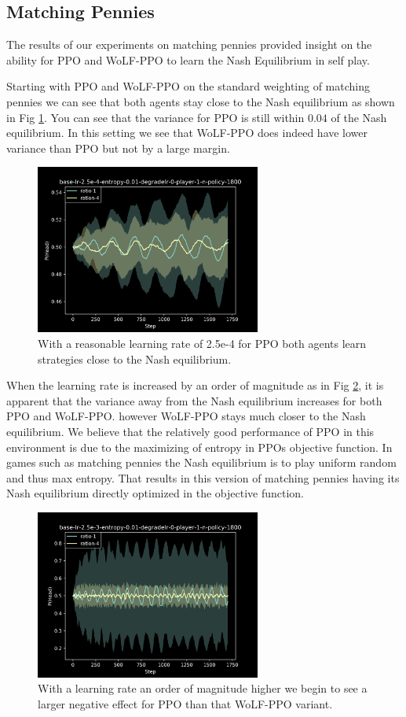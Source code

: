 \documentclass{article}
\begin{document}
\subsection{Matching Pennies}

The results of our experiments on matching pennies provided insight on the ability for PPO and WoLF-PPO to learn the Nash Equilibrium in self play.

Starting with PPO and WoLF-PPO on the standard weighting of matching pennies we can see that both agents stay close to the Nash equilibrium as shown in Fig \ref{fig:mp-ppo-e4}. You can see that the variance for PPO is still within $0.04$ of the Nash equilibrium. In this setting we see that WoLF-PPO does indeed have lower variance than PPO but not by a large margin.

\begin{figure}
    \centering
    \includegraphics[width=20em]{Figures/mp-ppo-e4.png}
    \caption{With a reasonable learning rate of 2.5e-4 for PPO both agents learn strategies close to the Nash equilibrium.}
    \label{fig:mp-ppo-e4}
\end{figure}

When the learning rate is increased by an order of magnitude as in Fig \ref{fig:mp-ppo-e3}, it is apparent that the variance away from the Nash equilibrium increases for both PPO and WoLF-PPO. however WoLF-PPO stays much closer to the Nash equilibrium. We believe that the relatively good performance of PPO in this environment is due to the maximizing of entropy in PPOs objective function. In games such as matching pennies the Nash equilibrium is to play uniform random and thus max entropy. That results in this version of matching pennies having its Nash equilibrium directly optimized in the objective function.

\begin{figure}
    \centering
    \includegraphics[width=20em]{Figures/mp-ppo-e3.png}
    \caption{With a learning rate an order of magnitude higher we begin to see a larger negative effect for PPO than that WoLF-PPO variant.}
    \label{fig:mp-ppo-e3}
\end{figure}
\end{document}
